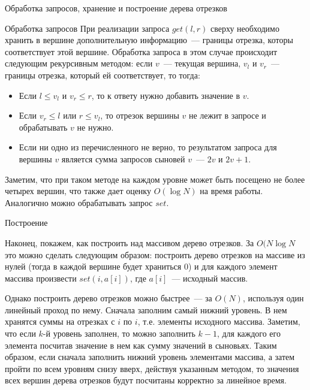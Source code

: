 \begin{section}{Обработка запросов, хранение и построение дерева отрезков}
\begin{subsection}{Обработка запросов}
При реализации запроса $get(l,r)$ сверху необходимо хранить в вершине дополнительную 
информацию~--- границы отрезка, которы соответствует этой вершине. Обработка запроса 
в этом случае происходит следующим рекурсивным методом: если $v$~--- текущая вершина,
$v_l$ и $v_r$~--- границы отрезка, который ей соответствует, то тогда:
\begin{itemize}

\item Если $l \le v_l$ и $v_r \le r$, то к ответу нужно добавить значение в $v$.
\item Если $v_r \le l$ или $r \le v_l$, то отрезок вершины $v$ не лежит в запросе и
обрабатывать $v$ не нужно.
\item Если ни одно из перечисленного не верно, то результатом запроса для вершины $v$
является сумма запросов сыновей $v$~--- $2v$ и $2v + 1$.

\end{itemize}
Заметим, что при таком методе на каждом уровне может быть посещено не более четырех вершин,
что также дает оценку $O(\log N)$ на время работы. Аналогично можно обрабатывать запрос $set$.

\end{subsection}

\begin{subsection}[Построение]{Построение}

Наконец, покажем, как построить над массивом дерево отрезков. За $O(N \log N$ это можно
сделать следующим образом: построить дерево отрезков на массиве из нулей (тогда в каждой
вершине будет храниться 0) и для каждого элемент массива произвести $set(i, a[i])$, где $a[i]$~---
исходный массив.

Однако построить дерево отрезков можно быстрее~--- за $O(N)$, используя один линейный проход по нему.
Сначала заполним самый нижний уровень. В нем хранятся суммы на отрезках с $i$ по $i$, т.е. элементы
исходного массива. Заметим, что если $k$-й уровень заполнен, то можно заполнить $k - 1$, для каждого
его элемента посчитав значение в нем как сумму значений в сыновьях. Таким образом, если сначала
заполнить нижний уровень элементами массива, а затем пройти по всем уровням снизу вверх, действуя 
указанным методом, то значения всех вершин дерева отрезков будут посчитаны корректно за линейное 
время.                                     

\end{subsection}

\end{section}